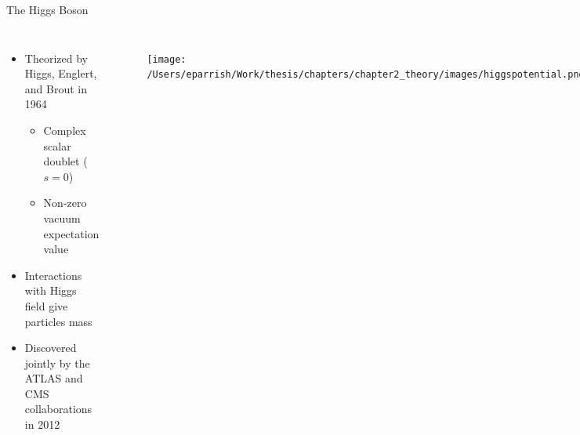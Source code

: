 \documentclass[aspectratio=169,xcolor=table]{beamer}
\begin{document}
  \begin{frame}[t]{The Higgs Boson}
    \begin{columns}
      \begin{itemize}
        \item Theorized by Higgs, Englert, and Brout in 1964
          \begin{itemize}
            \item Complex scalar doublet ($s=0$)
            \item Non-zero vacuum expectation value
          \end{itemize}
        \item Interactions with Higgs field give particles mass
        \item Discovered jointly by the ATLAS and CMS collaborations in 2012
      \end{itemize}
      \begin{figure}
        \texttt{[image: /Users/eparrish/Work/thesis/chapters/chapter2\_theory/images/higgspotential.png]}
        \caption{\tiny \cite{Higgs-phys}}
      \end{figure}
      \centering
      \begin{figure}
        \texttt{[image: /Users/eparrish/Work/thesis/chapters/chapter2\_theory/images/Higgs\_Discovery\_gam\_gam.png]}
        \caption{\tiny \cite{higgs-discovery-atlas}}
      \end{figure}
    \end{columns}
  \end{frame}
\end{document}
